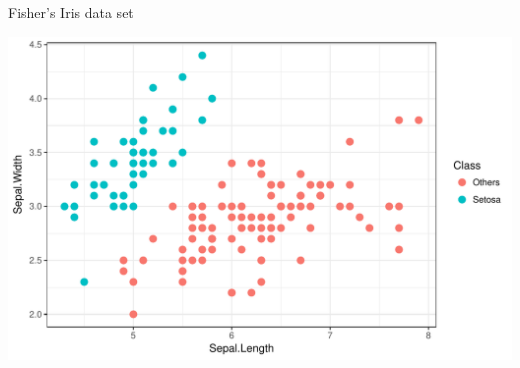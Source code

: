 \documentclass{beamer}\usepackage[]{graphicx}\usepackage[]{color}
\makeatletter
\def\maxwidth{ %
  \ifdim\Gin@nat@width>\linewidth
    \linewidth
  \else
    \Gin@nat@width
  \fi
}
\newenvironment{knitrout}{}{} %
\makeatother
\begin{document}
\begin{frame}[fragile]{Fisher's Iris data set}
\begin{knitrout}\small
{}\color{fgcolor}

{\centering \includegraphics[width=\maxwidth]{figure/data_iris-1} 

}



\end{knitrout}
\end{frame}
\end{document}
